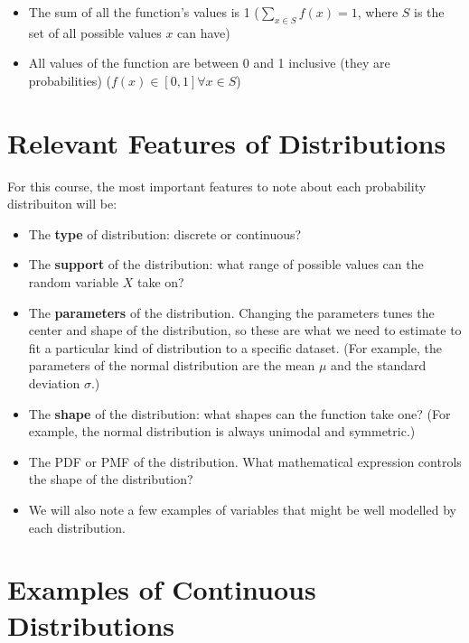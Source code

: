\documentclass[]{book}
\providecommand{\tightlist}{%
  \setlength{\itemsep}{0pt}\setlength{\parskip}{0pt}}
\begin{document}
\begin{itemize}
\tightlist
\item
  The sum of all the function's values is 1 (\(\sum_{x \in S} f(x) =1\), where \(S\) is the set of all possible values \(x\) can have)
\item
  All values of the function are between 0 and 1 inclusive (they are probabilities) (\(f(x) \in [0,1] \forall x \in S\))
\end{itemize}

\hypertarget{relevant-features-of-distributions}{%
\section{Relevant Features of Distributions}\label{relevant-features-of-distributions}}

For this course, the most important features to note about each probability distribuiton will be:

\begin{itemize}
\tightlist
\item
  The \textbf{type} of distribution: discrete or continuous?
\item
  The \textbf{support} of the distribution: what range of possible values can the random variable \(X\) take on?
\item
  The \textbf{parameters} of the distribution. Changing the parameters tunes the center and shape of the distribution, so these are what we need to estimate to fit a particular kind of distribution to a specific dataset. (For example, the parameters of the normal distribution are the mean \(\mu\) and the standard deviation \(\sigma\).)
\item
  The \textbf{shape} of the distribution: what shapes can the function take one? (For example, the normal distribution is always unimodal and symmetric.)
\item
  The PDF or PMF of the distribution. What mathematical expression controls the shape of the distribution?
\item
  We will also note a few examples of variables that might be well modelled by each distribution.
\end{itemize}

\hypertarget{examples-of-continuous-distributions}{%
\section{Examples of Continuous Distributions}\label{examples-of-continuous-distributions}}
\end{document}
